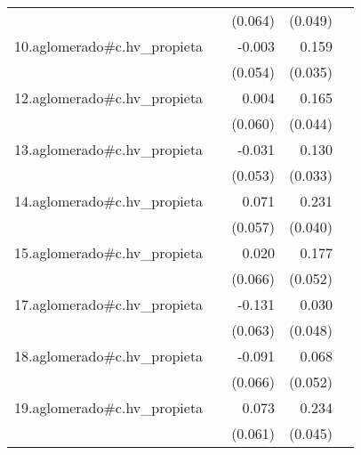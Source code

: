 {\begin{longtable}{l*{4}{D{.}{.}{-1}}}
            &                     &     (0.064)         &     (0.049)         &                     \\
\addlinespace
10.aglomerado#c.hv\_propieta&                     &      -0.003         &       0.159\sym{***}&                     \\
            &                     &     (0.054)         &     (0.035)         &                     \\
\addlinespace
12.aglomerado#c.hv\_propieta&                     &       0.004         &       0.165\sym{***}&                     \\
            &                     &     (0.060)         &     (0.044)         &                     \\
\addlinespace
13.aglomerado#c.hv\_propieta&                     &      -0.031         &       0.130\sym{***}&                     \\
            &                     &     (0.053)         &     (0.033)         &                     \\
\addlinespace
14.aglomerado#c.hv\_propieta&                     &       0.071         &       0.231\sym{***}&                     \\
            &                     &     (0.057)         &     (0.040)         &                     \\
\addlinespace
15.aglomerado#c.hv\_propieta&                     &       0.020         &       0.177\sym{***}&                     \\
            &                     &     (0.066)         &     (0.052)         &                     \\
\addlinespace
17.aglomerado#c.hv\_propieta&                     &      -0.131\sym{*}  &       0.030         &                     \\
            &                     &     (0.063)         &     (0.048)         &                     \\
\addlinespace
18.aglomerado#c.hv\_propieta&                     &      -0.091         &       0.068         &                     \\
            &                     &     (0.066)         &     (0.052)         &                     \\
\addlinespace
19.aglomerado#c.hv\_propieta&                     &       0.073         &       0.234\sym{***}&                     \\
            &                     &     (0.061)         &     (0.045)         &                     \\

\end{longtable}}
